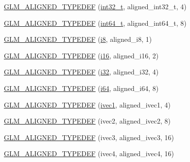 \begin{DoxyCompactItemize}
\item 
\hyperlink{group__gtx__type__aligned_gae553b33349d6da832cf0724f1e024094}{G\+L\+M\+\_\+\+A\+L\+I\+G\+N\+E\+D\+\_\+\+T\+Y\+P\+E\+D\+E\+F} (\hyperlink{group__gtc__type__precision_gab870c0eb6f525b0c8c4716762e0fc3a8}{int32\+\_\+t}, aligned\+\_\+int32\+\_\+t, 4)
\item 
\hyperlink{group__gtx__type__aligned_ga16d223a2b3409e812e1d3bd87f0e9e5c}{G\+L\+M\+\_\+\+A\+L\+I\+G\+N\+E\+D\+\_\+\+T\+Y\+P\+E\+D\+E\+F} (\hyperlink{group__gtc__type__precision_ga6abb23fbf4e39c50ec5341160b5da5ab}{int64\+\_\+t}, aligned\+\_\+int64\+\_\+t, 8)
\item 
\hyperlink{group__gtx__type__aligned_ga2de065d2ddfdb366bcd0febca79ae2ad}{G\+L\+M\+\_\+\+A\+L\+I\+G\+N\+E\+D\+\_\+\+T\+Y\+P\+E\+D\+E\+F} (\hyperlink{group__gtc__type__precision_gaae064be68b7d36cd7910c16e8ad18bba}{i8}, aligned\+\_\+i8, 1)
\item 
\hyperlink{group__gtx__type__aligned_gabd786bdc20a11c8cb05c92c8212e28d3}{G\+L\+M\+\_\+\+A\+L\+I\+G\+N\+E\+D\+\_\+\+T\+Y\+P\+E\+D\+E\+F} (\hyperlink{group__gtc__type__precision_ga35e5542ca05b29cc256fdafb8503d1fd}{i16}, aligned\+\_\+i16, 2)
\item 
\hyperlink{group__gtx__type__aligned_gad4aefe56691cdb640c72f0d46d3fb532}{G\+L\+M\+\_\+\+A\+L\+I\+G\+N\+E\+D\+\_\+\+T\+Y\+P\+E\+D\+E\+F} (\hyperlink{group__gtc__type__precision_ga1d8ed5c43e91ea7d4528389da4fa9524}{i32}, aligned\+\_\+i32, 4)
\item 
\hyperlink{group__gtx__type__aligned_ga8fe9745f7de24a8394518152ff9fccdc}{G\+L\+M\+\_\+\+A\+L\+I\+G\+N\+E\+D\+\_\+\+T\+Y\+P\+E\+D\+E\+F} (\hyperlink{group__gtc__type__precision_gac7a7eaad46064fc952b06df33689da23}{i64}, aligned\+\_\+i64, 8)
\item 
\hyperlink{group__gtx__type__aligned_gaaad735483450099f7f882d4e3a3569bd}{G\+L\+M\+\_\+\+A\+L\+I\+G\+N\+E\+D\+\_\+\+T\+Y\+P\+E\+D\+E\+F} (\hyperlink{namespaceglm_a946031cea0c22745848ebd873e6facb0}{ivec1}, aligned\+\_\+ivec1, 4)
\item 
\hyperlink{group__gtx__type__aligned_gac7b6f823802edbd6edbaf70ea25bf068}{G\+L\+M\+\_\+\+A\+L\+I\+G\+N\+E\+D\+\_\+\+T\+Y\+P\+E\+D\+E\+F} (ivec2, aligned\+\_\+ivec2, 8)
\item 
\hyperlink{group__gtx__type__aligned_ga3e235bcd2b8029613f25b8d40a2d3ef7}{G\+L\+M\+\_\+\+A\+L\+I\+G\+N\+E\+D\+\_\+\+T\+Y\+P\+E\+D\+E\+F} (ivec3, aligned\+\_\+ivec3, 16)
\item 
\hyperlink{group__gtx__type__aligned_ga50d8a9523968c77f8325b4c9bfbff41e}{G\+L\+M\+\_\+\+A\+L\+I\+G\+N\+E\+D\+\_\+\+T\+Y\+P\+E\+D\+E\+F} (ivec4, aligned\+\_\+ivec4, 16)

\end{DoxyCompactItemize}

